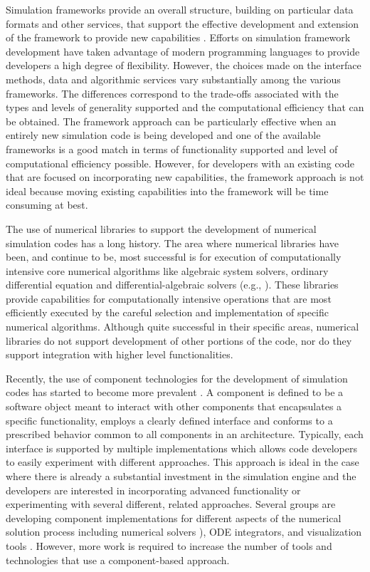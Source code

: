 Simulation frameworks provide an overall structure, building on
particular data formats and other services, that support the effective
development and extension of the framework to provide new capabilities
\cite{BeSh99,BrLa97,DoLa96,De97,StEd04}. Efforts on simulation
framework development have taken advantage of modern programming
languages to provide developers a high degree of flexibility. However,
the choices made on the interface methods, data and algorithmic
services vary substantially among the various frameworks. The
differences correspond to the trade-offs associated with the types and
levels of generality supported and the computational efficiency that
can be obtained.  The framework approach can be particularly effective
when an entirely new simulation code is being developed and one of the
available frameworks is a good match in terms of functionality
supported and level of computational efficiency possible. However, for
developers with an existing code that are focused on incorporating new
capabilities, the framework approach is not ideal because moving
existing capabilities into the framework will be time consuming at
best.

The use of numerical libraries to support the development of numerical
simulation codes has a long history. The area where numerical
libraries have been, and continue to be, most successful is for
execution of computationally intensive core numerical algorithms like
algebraic system solvers, ordinary differential equation and
differential-algebraic solvers (e.g.,
\cite{AsPe98,petsc,BaGr97,eispack,lapack,linpack}). These libraries
provide capabilities for computationally intensive operations that are
most efficiently executed by the careful selection and implementation
of specific numerical algorithms. Although quite successful in their
specific areas, numerical libraries do not support development of
other portions of the code, nor do they support integration with
higher level functionalities.

Recently, the use of component technologies for the development of
simulation codes has started to become more prevalent \cite{cca-app}.
A component is defined to be a software object meant to interact with
other components that encapsulates a specific functionality, employs a
clearly defined interface and conforms to a prescribed behavior common
to all components in an architecture. Typically, each interface is
supported by multiple implementations which allows code developers to
easily experiment with different approaches.  This approach is ideal
in the case where there is already a substantial investment in the
simulation engine and the developers are interested in incorporating
advanced functionality or experimenting with several different,
related approaches.  Several groups are developing component
implementations for different aspects of the numerical solution
process including numerical solvers \cite{petsc,BaGr97}), ODE
integrators, and visualization tools \cite{cca-paper}.  However, more
work is required to increase the number of tools and technologies that
use a component-based approach.

